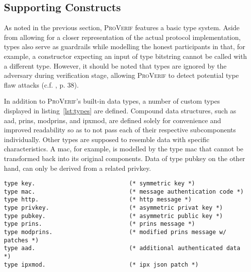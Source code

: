 \lstset{style=proverif}

\subsection{Supporting Constructs}

As noted in the previous section, \textsc{ProVerif} features a basic type system.
Aside from allowing for a closer representation of the actual protocol implementation, types also serve as guardrails while modelling the honest participants in that, for example, a constructor expecting an input of type bitstring cannot be called with a different type.
However, it should be noted that types are ignored by the adversary during verification stage, allowing \textsc{ProVerif} to detect potential type flaw attacks (c.f. \cite{blanchet2020proverif}, p. 38).

In addition to \textsc{ProVerif}'s built-in data types, a number of custom types displayed in listing~\ref{lst:types} are defined.
Compound data structures, such as {\sffamily aad}, {\sffamily prins}, {\sffamily modprins}, and {\sffamily ipxmod}, are defined solely for convenience and improved readability so as to not pass each of their respective subcomponents individually.
Other types are supposed to resemble data with specific characteristics.
A \gls{mac}, for example, is modelled by the type {\sffamily mac} that cannot be transformed back into its original components.
Data of type {\sffamily pubkey} on the other hand, can only be derived from a related {\sffamily privkey}.

\begin{lstlisting}[caption={Custom type definitions},label={lst:types},firstnumber=3]
type key.                           (* symmetric key *)
type mac.                           (* message authentication code *)
type http.                          (* http message *)
type privkey.                       (* asymmetric privat key *)
type pubkey.                        (* asymmetric public key *)
type prins.                         (* prins message *)
type modprins.                      (* modified prins message w/ patches *)
type aad.                           (* additional authenticated data *)
type ipxmod.                        (* ipx json patch *)
\end{lstlisting}

